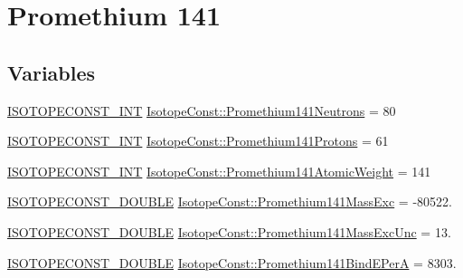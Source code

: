 \hypertarget{group___isotope_const-_promethium-_pm141}{}\section{Promethium 141}
\label{group___isotope_const-_promethium-_pm141}
\subsection*{Variables}
\begin{DoxyCompactItemize}
\item 
\mbox{\hyperlink{group___isotope_const-_macros_ga5f18360b3e99483a35c32d789e62621c}{I\+S\+O\+T\+O\+P\+E\+C\+O\+N\+S\+T\+\_\+\+I\+NT}} \mbox{\hyperlink{group___isotope_const-_promethium-_pm141_ga369d68e8c116a5f956739d0ae24d56c0}{Isotope\+Const\+::\+Promethium141\+Neutrons}} = 80
\item 
\mbox{\hyperlink{group___isotope_const-_macros_ga5f18360b3e99483a35c32d789e62621c}{I\+S\+O\+T\+O\+P\+E\+C\+O\+N\+S\+T\+\_\+\+I\+NT}} \mbox{\hyperlink{group___isotope_const-_promethium-_pm141_ga9ff01714a0fdb81a8819e7fe5ac2afec}{Isotope\+Const\+::\+Promethium141\+Protons}} = 61
\item 
\mbox{\hyperlink{group___isotope_const-_macros_ga5f18360b3e99483a35c32d789e62621c}{I\+S\+O\+T\+O\+P\+E\+C\+O\+N\+S\+T\+\_\+\+I\+NT}} \mbox{\hyperlink{group___isotope_const-_promethium-_pm141_gafb1e18c84208c0ecf8f6dd3ad8d37541}{Isotope\+Const\+::\+Promethium141\+Atomic\+Weight}} = 141
\item 
\mbox{\hyperlink{group___isotope_const-_macros_ga8f45a7272ce02c0b4c65c44636ed719a}{I\+S\+O\+T\+O\+P\+E\+C\+O\+N\+S\+T\+\_\+\+D\+O\+U\+B\+LE}} \mbox{\hyperlink{group___isotope_const-_promethium-_pm141_ga6bfc1cf4bb0b4eaa7d376305014d0722}{Isotope\+Const\+::\+Promethium141\+Mass\+Exc}} = -\/80522.
\item 
\mbox{\hyperlink{group___isotope_const-_macros_ga8f45a7272ce02c0b4c65c44636ed719a}{I\+S\+O\+T\+O\+P\+E\+C\+O\+N\+S\+T\+\_\+\+D\+O\+U\+B\+LE}} \mbox{\hyperlink{group___isotope_const-_promethium-_pm141_ga9f46c8d3cf422bbe177f2b35090adb3d}{Isotope\+Const\+::\+Promethium141\+Mass\+Exc\+Unc}} = 13.
\item 
\mbox{\hyperlink{group___isotope_const-_macros_ga8f45a7272ce02c0b4c65c44636ed719a}{I\+S\+O\+T\+O\+P\+E\+C\+O\+N\+S\+T\+\_\+\+D\+O\+U\+B\+LE}} \mbox{\hyperlink{group___isotope_const-_promethium-_pm141_ga5f423c411516f46ca845dc8d9f77362b}{Isotope\+Const\+::\+Promethium141\+Bind\+E\+PerA}} = 8303.

\end{DoxyCompactItemize}
